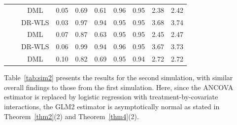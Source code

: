 \documentclass[12pt]{article}
\begin{document}
{\begin{table}[ht]
{\begin{tabular}{cccccccccc}
          & &  DML & 0.05 & 0.69 & 0.61 & 0.96 & 0.95 & 2.38 & 2.42 \\  
              \cmidrule(lr){2-10}
&  & DR-WLS & 0.03 & 0.97 & 0.94 & 0.95 & 0.95 & 3.68 & 3.74 \\ 
          & &  DML & 0.07 & 0.87 & 0.63 & 0.95 & 0.95 & 2.45 & 2.47 \\ 
              \cmidrule(lr){2-10}
&  & DR-WLS & 0.06 & 0.99 & 0.94 & 0.96 & 0.95 & 3.67 & 3.73 \\  
          & &  DML & 0.10 & 0.82 & 0.69 & 0.95 & 0.94 & 2.72 & 2.72 \\ 
\hline
    \end{tabular}
    }
\end{table}

Table~\ref{tab:sim2} presents the results for the second simulation, with similar overall findings to those from the first simulation. Here, since the ANCOVA estimator is replaced by logistic regression with treatment-by-covariate interactions, the GLM2 estimator is asymptotically normal as stated in Theorem~\ref{thm2}(2) and Theorem~\ref{thm4}(2). 

}
\end{document}
